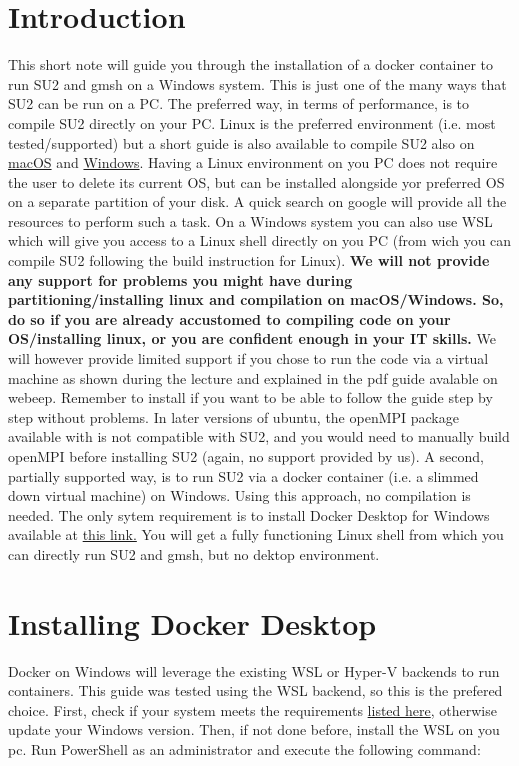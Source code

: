 \section*{Introduction}\label{chapter:introduction}
This short note will guide you through the installation of a docker container to run SU2 and gmsh on a Windows system. This is just one of the many ways that SU2 can be run on a PC. The preferred way, in terms of performance, is to compile SU2 directly on your PC. Linux is the preferred environment (i.e. most tested/supported) but a short guide is also available to compile SU2 also on \href{https://su2code.github.io/docs_v7/Build-SU2-Linux-MacOS/}{macOS} and \href{https://su2code.github.io/docs_v7/Build-SU2-Windows/}{Windows}. Having a Linux environment on you PC does not require the user to delete its current OS, but can be installed alongside yor preferred OS on a separate partition of your disk. A quick search on google will provide all the resources to perform such a task. On a Windows system you can also use WSL which will give you access to a Linux shell directly on you PC (from wich you can compile SU2 following the build instruction for Linux). \textbf{We will not provide any support for problems you might have during partitioning/installing linux and compilation on macOS/Windows. So, do so if you are already accustomed to compiling code on your OS/installing linux, or you are confident enough in your IT skills.} We will however provide limited support if you chose to run the code via a virtual machine as shown during the lecture and explained in the pdf guide avalable on webeep. Remember to install  if you want to be able to follow the guide step by step without problems. In later versions of ubuntu, the openMPI package available with  is not compatible with SU2, and you would need to manually build openMPI before installing SU2 (again, no support provided by us).
A second, partially supported way, is to run SU2 via a docker container (i.e. a slimmed down virtual machine) on Windows. Using this approach, no compilation is needed. The only sytem requirement is to install Docker Desktop for Windows available at \href{https://docs.docker.com/desktop/install/windows-install/}{this link.} You will get a fully functioning Linux shell from which you can directly run SU2 and gmsh, but no dektop environment.

\section*{Installing Docker Desktop}
Docker on Windows will leverage the existing WSL or Hyper-V backends to run containers. This guide was tested using the WSL backend, so this is the prefered choice. First, check if your system meets the requirements \href{https://docs.docker.com/desktop/install/windows-install/}{listed here}, otherwise update your Windows version. Then, if not done before, install the WSL on you pc. Run PowerShell as an administrator and execute the following command:

